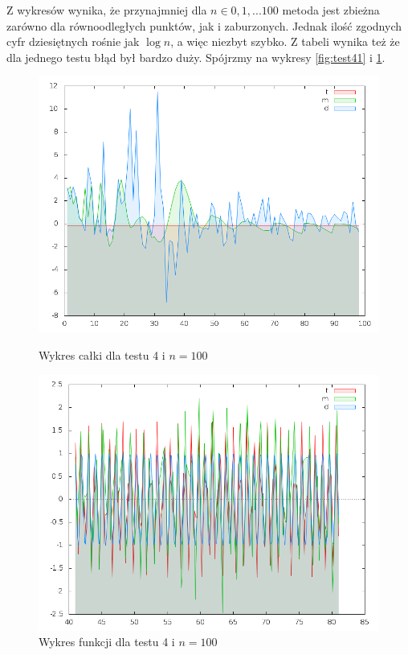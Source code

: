 \documentclass[11pt,wide]{mwart}
\begin{document}
Z wykresów wynika, że przynajmniej dla $n\in{0,1,...100}$ metoda jest zbieżna zarówno dla równoodległych punktów, jak i zaburzonych. Jednak ilość zgodnych cyfr dziesiętnych rośnie jak $\log{n}$, a więc niezbyt szybko. Z tabeli wynika też że dla jednego testu błąd był bardzo duży. Spójrzmy na wykresy \ref{fig:test41} i \ref{fig:test42}.\\
\begin{figure}[!h]
  \begin{minipage}[b]{0.45\linewidth}
    \centering
    \includegraphics[width=\linewidth]{../wykresy/test4_int.png}
    \caption{Wykres całki dla testu 4 i $n=100$}
    \label{fig:test41}
  \end{minipage}
  \hspace{0.5cm}
  \begin{minipage}[b]{0.45\linewidth}
    \centering
    \includegraphics[width=\linewidth]{../wykresy/test4_spline.png}
    \caption{Wykres funkcji dla testu 4 i $n=100$}
    \label{fig:test42}
  \end{minipage}
\end{figure}
\end{document}
